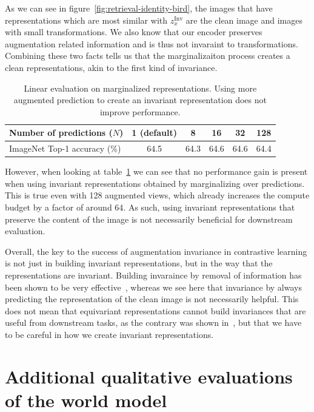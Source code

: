 \documentclass[twocolumn]{fairmeta}
\theoremstyle{plain}
\theoremstyle{definition}
\theoremstyle{remark}
\begin{document}
As we can see in figure~\ref{fig:retrieval-identity-bird},  the images that have representations which are most similar with  $z_x^{\text{Inv}}$ are the clean image and images with small transformations. We also know that our encoder preserves augmentation related information and is thus not invaraint to transformations. Combining these two facts tells us that the marginalizaiton process creates a clean representations, akin to the first kind of invariance.

\begin{table}[!h]
\centering
    \caption{Linear evaluation on marginalized representations. Using more augmented prediction to create an invariant representation does not improve performance. }
    \label{tab:marginalisation}
\begin{tabular}{lccccc}
\toprule
Number of predictions ($N$) & 1 (default) & 8 & 16 & 32 & 128   \\
\midrule
ImageNet Top-1 accuracy (\%) & 64.5 & 64.3 & 64.6 & 64.6 & 64.4 \\
\bottomrule
\end{tabular}
\end{table}

However, when looking at table~\ref{tab:marginalisation} we can see that no performance gain is present when using invariant representations obtained by marginalizing over predictions. This is true even with 128 augmented views, which already increases the compute budget by a factor of around 64. As such, using invariant representations that preserve the content of the image is not necessarily beneficial for downstream evaluation.

Overall, the key to the success of augmentation invariance in contrastive learning is not just in building invariant representations, but in the way that the representations are invariant. Building invaraince by removal of information has been shown to be very effective~\citep{chen2020simple}, whereas we see here that invariance by always predicting the representation of the clean image is not necessarily helpful. This does not mean that equivariant representations cannot build invariances that are useful from downstream tasks, as the contrary was shown in~\cite{chavhan2023amortised}, but that we have to be careful in how we create invariant representations.


\clearpage

\section{Additional qualitative evaluations of the world model \label{app:more-qualitative}}
\end{document}

